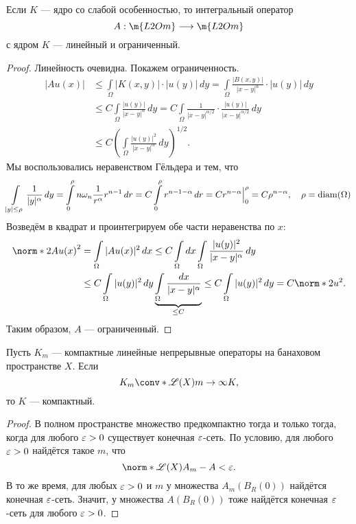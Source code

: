 \begin{theorem} Если $K$ --- ядро со слабой особенностью, то интегральный оператор
$$A: \m{L2Om} \longrightarrow \m{L2Om}$$
с ядром $K$ --- линейный и ограниченный.
\end{theorem}
\begin{proof}
Линейность очевидна. Покажем ограниченность.
\begin{align*}
|Au(x)| &\leq \int \limits_\Omega |K(x,y)| \cdot |u(y)| \, dy = \int \limits_\Omega \frac {|B(x,y)|} {|x-y|^\alpha} \cdot |u(y)| \, dy \\
&\leq C \int \limits_\Omega \frac {|u(y)|} {|x-y|^\alpha} \, dy = C \int \limits_\Omega \frac {1} {|x-y|^{\alpha/2}} \cdot \frac {|u(y)|} {|x-y|^{\alpha/2}} \, dy \\ 
&\leq C \left( \int \limits_\Omega \frac {|u(y)|^2}{|x-y|^\alpha} \, dy \right)^{1/2}.
\end{align*}
Мы воспользовались неравенством Гёльдера и тем, что 
$$\int \limits_{|y| \leq \rho} \frac {1} {|y|^\alpha} \, dy = \int \limits_0^\rho n \omega_n \frac {1} {r^\alpha} r^{n-1} \, dr  = C \int \limits_0^\rho r^{n-1-\alpha} \, dr = C r^{n-\alpha} \Big\rvert_0^\rho = C \rho^{n-\alpha}, \quad \rho = \operatorname{diam}(\Omega)$$
Возведём в квадрат и проинтегрируем обе части неравенства по $x$:
\begin{align*}
\norm*{2}{Au(x)}^2 &= \int \limits_\Omega |Au(x)|^2 \, dx \leq C \int \limits_\Omega dx \int \limits_\Omega \frac {|u(y)|^2} {|x-y|^\alpha} \, dy \\
&\leq C \int \limits_\Omega |u(y)|^2 \, dy \underbrace {\int \limits_\Omega \frac {dx} {|x-y|^\alpha} }_{\leq C} \leq C \int \limits_\Omega |u(y)|^2 \, dy = C \norm*{2}{u}^2.  
\end{align*}
Таким образом, $A$ --- ограниченный.

\end{proof}


\begin{note}
Пусть $K_m$ --- компактные линейные непрерывные операторы на банаховом пространстве $X$. Если
$$ K_m \conv*{\mathscr{L} (X)}{m \to \infty} K,$$
то $K$ --- компактный.
\end{note}
\begin{proof}
В полном пространстве множество предкомпактно тогда и только тогда, когда для любого $\varepsilon > 0$ существует конечная $\varepsilon$-сеть. По условию, для любого $\varepsilon > 0$ найдётся такое $m$, что
$$ \norm*{\mathscr{L} (X)}{A_m - A} < \eps.$$
В то же время, для любых $\varepsilon > 0$ и $m$ у множества $A_m (B_R(0))$ найдётся конечная $\varepsilon$-сеть. Значит, у множества $A(B_R(0))$ тоже найдётся конечная $\varepsilon$-сеть для любого $\varepsilon > 0$. 

\end{proof}

